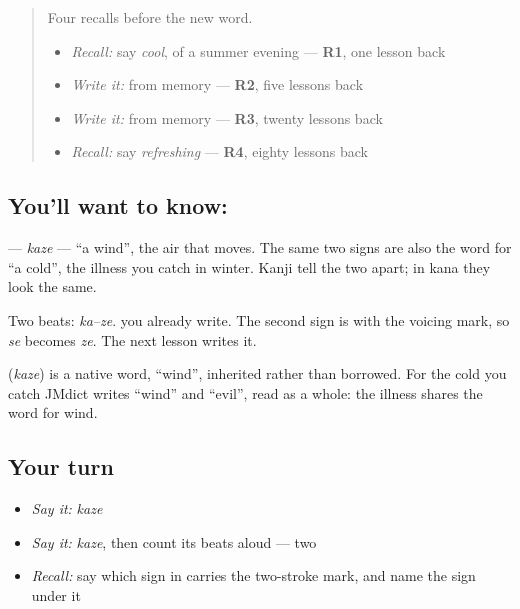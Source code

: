 \begin{quote}
Four recalls before the new word.

\begin{itemize}
\raggedright
  \item \emph{Recall:} say \emph{cool}, of a summer evening — \textbf{R1}, one lesson back
  \item \emph{Write it:} \textbf{} from memory — \textbf{R2}, five lessons back
  \item \emph{Write it:} \textbf{} from memory — \textbf{R3}, twenty lessons back
  \item \emph{Recall:} say \emph{refreshing} — \textbf{R4}, eighty lessons back
\end{itemize}
\end{quote}

\subsection*{You'll want to know: }
\textbf{} — \emph{kaze} — \textquotedblleft{}a wind\textquotedblright{}, the air that moves. The same two signs are also the word for \textquotedblleft{}a cold\textquotedblright{}, the illness you catch in winter. Kanji tell the two apart; in kana they look the same.

Two beats: \emph{ka–ze}. \textbf{} you already write. The second sign is \textbf{} with the voicing mark, so \emph{se} becomes \emph{ze}. The next lesson writes it.

\begin{cousinweb}
\textbf{} (\emph{kaze}) is a native word, \textquotedblleft{}wind\textquotedblright{}, inherited rather than borrowed. For the cold you catch JMdict writes \textquotedblleft{}wind\textquotedblright{} and \textquotedblleft{}evil\textquotedblright{}, read as a whole: the illness shares the word for wind.
\end{cousinweb}

\subsection*{Your turn}
\begin{itemize}
\raggedright
  \item \emph{Say it:} \emph{kaze}
  \item \emph{Say it:} \emph{kaze}, then count its beats aloud — two
  \item \emph{Recall:} say which sign in \textbf{} carries the two-stroke mark, and name the sign under it
\end{itemize}

